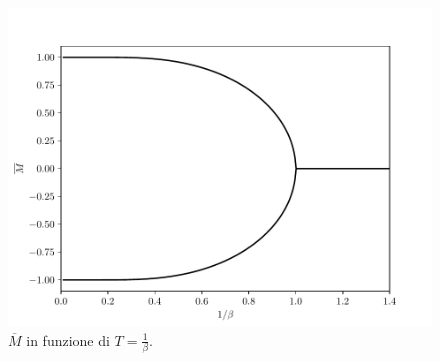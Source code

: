 \begin{figure}
    \centering
    \includegraphics[scale=0.8]{img/cw/transizione.pdf}
    \caption{$ \overline{M} $ in funzione di $ T = \frac{1}{\beta}$.}
\end{figure}
\fi

